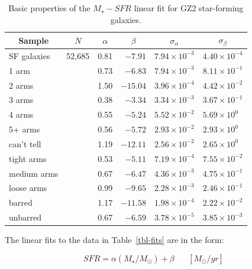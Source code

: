 \documentclass{emulateapj}
\begin{document}
\begin{table} \caption{Basic properties of the $M_\star-SFR$ linear fit for GZ2 star-forming galaxies.}
 \begin{tabular}{@{}lrrrll}
 \hline
\multicolumn{1}{c}{Sample} &
\multicolumn{1}{c}{$N$} &
\multicolumn{1}{c}{$\alpha$} &
\multicolumn{1}{c}{$\beta$} &
\multicolumn{1}{c}{$\sigma_\alpha$} &
\multicolumn{1}{c}{$\sigma_\beta$} 
\\ 
\hline
\hline						
SF galaxies  & 52,685  & 0.81  & $-7.91$   & $7.94\times10^{-3}$   & $4.40\times10^{-4}$  \\
\hline
1 arm        &         & 0.73  & $ -6.83$  &  $7.94\times10^{-3}$  & $8.11\times10^{-1}$  \\
2 arms       &         & 1.50  & $-15.04$  &  $3.96\times10^{-4}$  & $4.42\times10^{-2}$  \\
3 arms       &         & 0.38  & $ -3.34$  &  $3.34\times10^{-3}$  & $3.67\times10^{-1}$  \\
4 arms       &         & 0.55  & $ -5.24$  &  $5.52\times10^{-2}$  & $5.69\times10^{0 }$  \\
5+ arms      &         & 0.56  & $ -5.72$  &  $2.93\times10^{-2}$  & $2.93\times10^{0 }$  \\
can't tell   &         & 1.19  & $-12.11$  &  $2.56\times10^{-2}$  & $2.65\times10^{0 }$  \\
\hline
tight arms   &         & 0.53  & $-5.11$   &  $7.19\times10^{-4}$  & $7.55\times10^{-2}$  \\
medium arms  &         & 0.67  & $-6.47$   &  $4.36\times10^{-3}$  & $4.75\times10^{-1}$  \\
loose arms   &         & 0.99  & $-9.65$   &  $2.28\times10^{-3}$  & $2.46\times10^{-1}$  \\
\hline
barred       &         & 1.17  & $-11.58$  &  $1.98\times10^{-4}$  & $2.22\times10^{-2}$  \\
unbarred     &         & 0.67  & $ -6.59$  &  $3.78\times10^{-5}$  & $3.85\times10^{-3}$  \\
\hline
 \end{tabular}
\end{table}

The linear fits to the data in Table~\ref{tbl-fits} are in the form:

\begin{equation}
SFR = \alpha(M_\star/M_\odot) + \beta \hspace{20pt}[M_\odot/yr]
\label{eqn-linearfit}
\end{equation}
\end{document}
